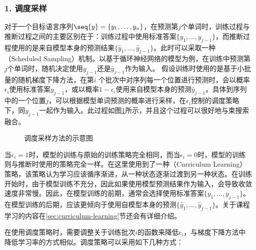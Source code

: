 
\subsubsection{1. 调度采样}

\parinterval 对于一个目标语言序列$\seq{y}=\{{y}_1,\ldots,{y}_n\}$，在预测第$j$个单词时，训练过程与推断过程之间的主要区别在于：训练过程中使用标准答案$\{{y}_{1},...,{y}_{j-1}\}$，而推断过程使用的是来自模型本身的预测结果$\{\hat{{y}}_{1},...,\hat{{y}}_{j-1}\}$。此时可以采取一种{\small{}}（Scheduled Sampling）机制。以基于循环神经网络的模型为例，在训练中预测第$j$个单词时，随机决定使用${y}_{j-1}$还是$\hat{{y}}_{j-1}$作为输入。 假设训练时使用的是基于小批量的随机梯度下降方法，在第$i$ 个批次中对序列每一个位置进行预测时，会以概率$\epsilon_i$使用标准答案${y}_{j-1}$，或以概率${1-\epsilon_i}$使用来自模型本身的预测$\hat{{y}}_{j-1}$。具体到序列中的一个位置$j$，可以根据模型单词预测的概率进行采样，在$\epsilon_i$控制的调度策略下，同${y}_{j-1}$一起作为输入。此过程如图\ref{fig:13-9}所示，并且这个过程可以很好地与束搜索融合。

\begin{figure}[htp]
\centering

\caption{调度采样方法的示意图}
\label{fig:13-9}
\end{figure}

\parinterval 当$\epsilon_i=1$时，模型的训练与原始的训练策略完全相同，而当$\epsilon_i=0$时，模型的训练则与推断时使用的策略完全一样。在这里使用到了一种{\small{}}（Curriculum Learning）策略，该策略认为学习应该循序渐进，从一种状态逐渐过渡到另一种状态。在训练开始时，由于模型训练不充分，因此如果使用模型预测结果作为输入，会导致收敛速度非常慢。因此，在模型训练的前期，通常会选择使用标准答案$\{{y}_{1},...,{y}_{j-1}\}$。在模型训练的后期，应该更倾向于使用自模型本身的预测$\{\hat{{y}}_{1},...,\hat{{y}}_{j-1}\}$。关于课程学习的内容在\ref{sec:curriculum-learning}节还会有详细介绍。

\parinterval 在使用调度策略时，需要调整关于训练批次$i$的函数来降低$\epsilon_i$，与梯度下降方法中降低学习率的方式相似。调度策略可以采用如下几种方式：

